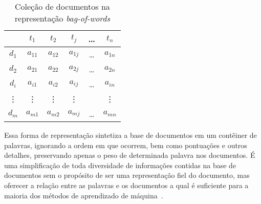 \begin{table}[!h]
	\centering

	\begin{tabular}{|c|ccccc|}

	\hline
	    & $t_1$      & $t_2$     & $t_j$    & \dots & $t_n$      \\ \hline \hline
	$d_1$ & $a_{11}$ & $a_{12}$  & $a_{1j}$ & \dots & $a_{1n}$   \\  %
	$d_2$ & $a_{21}$ & $a_{22}$  & $a_{2j}$ & \dots & $a_{2n}$   \\  %
	$d_i$ & $a_{i1}$ & $a_{i2}$  & $a_{ij}$ & \dots & $a_{in}$   \\  %
	\vdots & \vdots    & \vdots     & \vdots    & \ddots & \vdots      \\  %
	$d_m$ & $a_{m1}$ & $a_{m2}$  & $a_{mj}$ & \dots & $a_{mn}$   \\  \hline 

	\end{tabular}

	\caption{Coleção de documentos na representação \textit{bag-of-words}}
	\label{table:bagofwords} 
\end{table}


Essa forma de representação sintetiza a base de documentos em um contêiner de palavras, ignorando a ordem em que ocorrem, bem como pontuações e outros detalhes, preservando apenas o peso de determinada palavra nos documentos. É uma simplificação de toda diversidade de informações contidas na base de documentos sem o propósito de ser uma representação fiel do documento, mas oferecer a relação entre as palavras e os documentos a qual é suficiente para a maioria dos métodos de aprendizado de máquina~\cite{Rezende2003}. 







